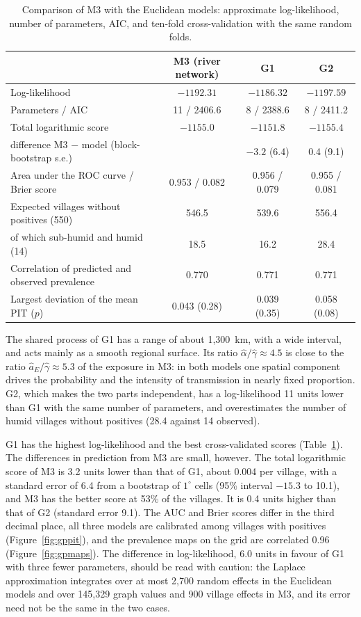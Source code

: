 \documentclass[11pt,a4paper]{article}
\begin{document}
\begin{table}[H]
\centering
\small
\caption{Comparison of M3 with the Euclidean models: approximate log-likelihood, number of parameters, AIC, and ten-fold cross-validation with the same random folds.}
\label{tab:gpcmp}
\footnotesize
\begin{tabular}{lccc}
\toprule
 & M3 (river network) & G1 & G2 \\
\midrule
Log-likelihood & $-1192.31$ & $-1186.32$ & $-1197.59$ \\
Parameters / AIC & 11 / 2406.6 & 8 / 2388.6 & 8 / 2411.2 \\
\midrule
Total logarithmic score & $-1155.0$ & $-1151.8$ & $-1155.4$ \\
\quad difference M3 $-$ model (block-bootstrap s.e.) & & $-3.2$ (6.4) & 0.4 (9.1) \\
Area under the ROC curve / Brier score & 0.953 / 0.082 & 0.956 / 0.079 & 0.955 / 0.081 \\
Expected villages without positives (550) & 546.5 & 539.6 & 556.4 \\
\quad of which sub-humid and humid (14) & 18.5 & 16.2 & 28.4 \\
Correlation of predicted and observed prevalence & 0.770 & 0.771 & 0.771 \\
Largest deviation of the mean PIT ($p$) & 0.043 (0.28) & 0.039 (0.35) & 0.058 (0.08) \\
\bottomrule
\end{tabular}
\end{table}

The shared process of G1 has a range of about 1{,}300~km, with a wide interval, and acts mainly as a smooth regional surface. Its ratio $\hat\alpha / \hat\gamma \approx 4.5$ is close to the ratio $\hat a_E / \hat\gamma \approx 5.3$ of the exposure in M3: in both models one spatial component drives the probability and the intensity of transmission in nearly fixed proportion. G2, which makes the two parts independent, has a log-likelihood 11 units lower than G1 with the same number of parameters, and overestimates the number of humid villages without positives (28.4 against 14 observed).

G1 has the highest log-likelihood and the best cross-validated scores (Table~\ref{tab:gpcmp}). The differences in prediction from M3 are small, however. The total logarithmic score of M3 is 3.2 units lower than that of G1, about 0.004 per village, with a standard error of 6.4 from a bootstrap of $1^\circ$ cells (95\% interval $-15.3$ to 10.1), and M3 has the better score at 53\% of the villages. It is 0.4 units higher than that of G2 (standard error 9.1). The AUC and Brier scores differ in the third decimal place, all three models are calibrated among villages with positives (Figure~\ref{fig:gppit}), and the prevalence maps on the grid are correlated 0.96 (Figure~\ref{fig:gpmaps}). The difference in log-likelihood, 6.0 units in favour of G1 with three fewer parameters, should be read with caution: the Laplace approximation integrates over at most 2{,}700 random effects in the Euclidean models and over 145{,}329 graph values and 900 village effects in M3, and its error need not be the same in the two cases.
\end{document}

